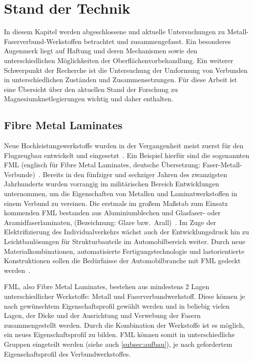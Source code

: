 \chapter{Stand der Technik}\label{ch:stand}

In diesem Kapitel werden abgeschlossene und aktuelle Untersuchungen zu Metall-Faserverbund-Werkstoffen betrachtet und zusammengefasst.
Ein besonderes Augenmerk liegt auf Haftung und deren Mechanismen sowie den unterschiedlichen Möglichkeiten der Oberflächenvorbehandlung.
Ein weiterer Schwerpunkt der Recherche ist die Untersuchung der Umformung von Verbunden in unterschiedlichen Zuständen und Zusammensetzungen.
Für diese Arbeit ist eine Übersicht über den aktuellen Stand der Forschung zu Magnesiumknetlegierungen wichtig und daher enthalten.

\section{Fibre Metal Laminates}\label{sec:FML}

Neue Hochleistungswerkstoffe wurden in der Vergangenheit meist zuerst für den Flugzeugbau entwickelt und eingesetzt~\cite{Wu2005}.
Ein Beispiel hierfür sind die sogenannten FML (englisch für Fibre Metal Laminates, deutsche Übersetzung: Faser-Metall-Verbunde)~.
Bereits in den fünfziger und sechziger Jahren des zwanzigsten Jahrhunderts wurden vorrangig im militärischen Bereich Entwicklungen unternommen, um die Eigenschaften von Metallen und Laminatwerkstoffen in einem Verbund zu vereinen.
Die erstmals im großem Maßstab zum Einsatz kommenden FML bestanden aus Aluminiumblechen und Glasfaser- oder Aramidfaserlaminaten, (Bezeichnung: Glare bzw.\ Arall)~\cite{Vogelesang2000}.
Im Zuge der Elektrifizierung des Individualverkehrs wächst auch der Entwicklungsdruck hin zu Leichtbaulösungen für Strukturbauteile im Automobilbereich weiter.
Durch neue Materialkombinationen, automatisierte Fertigungstechnologie und lastorientierte Konstruktionen sollen die Bedürfnisse der Automobilbranche mit FML gedeckt werden~\cite{Wollmann2018}.

FML, also Fibre Metal Laminates, bestehen aus mindestens 2 Lagen unterschiedlicher Werkstoffe: Metall und Faserverbundwerkstoff.
Diese können je nach gewünschtem Eigenschaftsprofil gewählt werden und in beliebig vielen Lagen, der Dicke und der Ausrichtung und Verwebung der Fasern zusammengestellt werden.
Durch die Kombination der Werkstoffe ist es möglich, ein neues Eigenschaftsprofil zu bilden.
FML können somit in unterschiedliche Gruppen eingeteilt werden (siehe auch \autoref{subsec:aufbau}), je nach gefordertem Eigenschaftsprofil des Verbundwerkstoffes.

